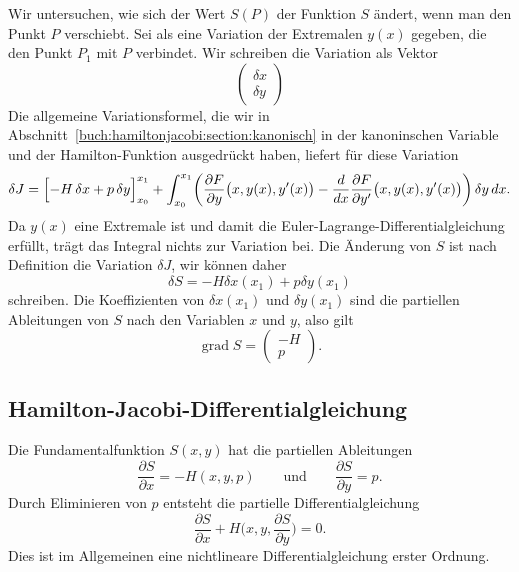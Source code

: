 Wir untersuchen, wie sich der Wert $S(P)$ der Funktion $S$ ändert,
wenn man den Punkt $P$ verschiebt.
Sei als eine Variation der Extremalen $y(x)$ gegeben, die den Punkt $P_1$
mit $P$ verbindet.
Wir schreiben die Variation als Vektor
\[
\begin{pmatrix}
\delta x\\
\delta y
\end{pmatrix}
\]
Die allgemeine Variationsformel, die wir in 
Abschnitt~\ref{buch:hamiltonjacobi:section:kanonisch}
in der kanoninschen Variable und der Hamilton-Funktion ausgedrückt
haben, liefert für diese Variation
\[
\delta J
=
\Bigl[ -H\,\delta x + p \,\delta y \Bigr]_{x_0}^{x_1}
+
\int_{x_0}^{x_1}
\biggl(
\frac{\partial F}{\partial y}\bigl(x,y(x),y'(x)\bigr)
-
\frac{d}{dx}
\frac{\partial F}{\partial y'}\bigl(x,y(x),y'(x)\bigr)
\biggr)
\,
\delta y
\,dx.
\]
Da $y(x)$ eine Extremale ist und damit die
Euler-Lagrange-Differentialgleichung erfüllt, trägt das Integral
nichts zur Variation bei.
Die Änderung von $S$ ist nach Definition die Variation $\delta J$,
wir können daher
\[
\delta S
=
-H\delta x(x_1) + p\delta y(x_1)
\]
schreiben.
Die Koeffizienten von $\delta x(x_1)$ und $\delta y(x_1)$ sind die
partiellen Ableitungen von $S$ nach den Variablen $x$ und $y$, also
gilt
\[
\operatorname{grad} S
=
\begin{pmatrix}
-H\\
p
\end{pmatrix}.
\]

%
%
\subsection{Hamilton-Jacobi-Differentialgleichung
\label{buch:hamiltonjacobi:jacobi:subsection:HJ-DGL}}
Die Fundamentalfunktion $S(x,y)$ hat die partiellen Ableitungen
\begin{equation}
\frac{\partial S}{\partial x}
=
-H(x,y,p)
\qquad\text{und}\qquad
\frac{\partial S}{\partial y}
=
p.
\label{buch:hamiltonjacobi:jacobi:eqn:ableitungen}
\end{equation}
Durch Eliminieren von $p$ entsteht die partielle Differentialgleichung
\begin{equation}
\frac{\partial S}{\partial x}
+
H\biggl(x,y,\frac{\partial S}{\partial y}\biggr) 
=
0.
\label{buch:hamiltonjacobi:jacobi:eqn:hamilton-jacobi-dgl}
\end{equation}
Dies ist im Allgemeinen eine nichtlineare Differentialgleichung
erster Ordnung.

